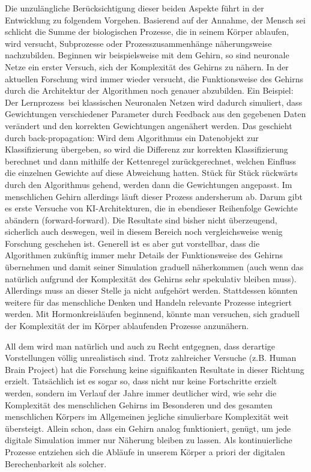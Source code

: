 \documentclass[12pt]{article}
\begin{document}
Die unzulängliche Berücksichtigung dieser beiden Aspekte führt in der Entwicklung zu folgendem Vorgehen.
Basierend auf der Annahme, der Mensch sei schlicht die Summe der biologischen Prozesse, die in seinem Körper ablaufen, wird versucht, 
Subprozesse oder Prozesszusammenhänge näherungsweise nachzubilden.
Beginnen wir beispielsweise mit dem Gehirn, so sind neuronale Netze ein erster Versuch, sich der Komplexität des Gehirns zu nähern.
In der aktuellen Forschung wird immer wieder versucht, die Funktionsweise des Gehirns durch die Architektur der Algorithmen noch genauer abzubilden.
Ein Beispiel: Der \glqq Lernprozess\grqq\ bei klassischen Neuronalen Netzen wird dadurch simuliert, dass Gewichtungen verschiedener Parameter durch Feedback aus den
gegebenen Daten verändert und den korrekten Gewichtungen angenähert werden. Das geschieht durch back-propagation:
Wird dem Algorithmus ein Datenobjekt zur Klassifizierung übergeben, so wird die Differenz zur korrekten Klassifizierung berechnet und dann mithilfe
der Kettenregel zurückgerechnet, welchen Einfluss die einzelnen Gewichte auf diese Abweichung hatten. Stück für Stück rückwärts durch den Algorithmus gehend,
werden dann die Gewichtungen angepasst. Im menschlichen Gehirn allerdings läuft dieser Prozess andersherum ab.
Darum gibt es erste Versuche von KI-Architekturen, die in ebendieser Reihenfolge Gewichte abändern (forward-forward).
Die Resultate sind bisher nicht überzeugend, sicherlich auch deswegen, weil in diesem Bereich noch vergleichsweise wenig Forschung geschehen ist. 
Generell ist es aber gut vorstellbar, dass die Algorithmen zukünftig immer mehr Details der Funktionsweise des Gehirns übernehmen
und damit seiner Simulation graduell näherkommen (auch wenn das natürlich aufgrund der Komplexität des Gehirns sehr spekulativ bleiben muss).
Allerdings muss an dieser Stelle ja nicht aufgehört werden. Stattdessen könnten weitere für das menschliche Denken und Handeln relevante Prozesse integriert werden.
Mit Hormonkreisläufen beginnend, könnte man versuchen, sich graduell der Komplexität der im Körper ablaufenden Prozesse anzunähern.

All dem wird man natürlich und auch zu Recht entgegnen, dass derartige Vorstellungen völlig unrealistisch sind.
Trotz zahlreicher Versuche (z.B. Human Brain Project) hat die Forschung keine signifikanten Resultate in dieser Richtung erzielt.
Tatsächlich ist es sogar so, dass nicht nur keine Fortschritte erzielt werden, sondern im Verlauf der Jahre immer deutlicher wird, 
wie sehr die Komplexität des menschlichen Gehirns im Besonderen und des gesamten menschlichen Körpers im Allgemeinen 
jegliche simulierbare Komplexität weit übersteigt.
Allein schon, dass ein Gehirn analog funktioniert, genügt, um jede digitale Simulation immer nur Näherung bleiben zu lassen.
Als kontinuierliche Prozesse entziehen sich die Abläufe in unserem Körper a priori der digitalen Berechenbarkeit als solcher.
\end{document}
